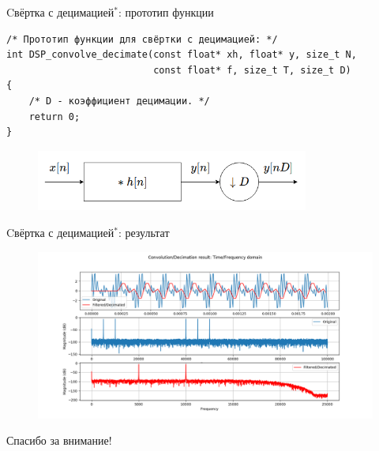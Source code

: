 \documentclass{beamer}
\begin{document}
    \begin{frame}[fragile]{Cвёртка с децимацией$^{*}$: прототип функции}
        \begin{verbatim}
/* Прототип функции для свёртки с децимацией: */
int DSP_convolve_decimate(const float* xh, float* y, size_t N, 
                          const float* f, size_t T, size_t D)
{
    /* D - коэффициент децимации. */
    return 0;
}
        \end{verbatim}
        \begin{figure}[!tbp]
           \centering
           \includegraphics[width=0.8\textwidth]{pics/convdec.png}
           \captionsetup{justification=centering}
        \end{figure}
    \end{frame}
    \begin{frame}[fragile]{Cвёртка с децимацией$^{*}$: результат}
        \begin{figure}[!tbp]
           \centering
           \includegraphics[width=\textwidth]{pics/result_decimated.png}
           \captionsetup{justification=centering}
        \end{figure}
    \end{frame}
    \begin{frame}
        \begin{center}
        \baselineskip 20.0mm
        \Huge Спасибо за внимание!
        \end{center}
    \end{frame}
\end{document}
